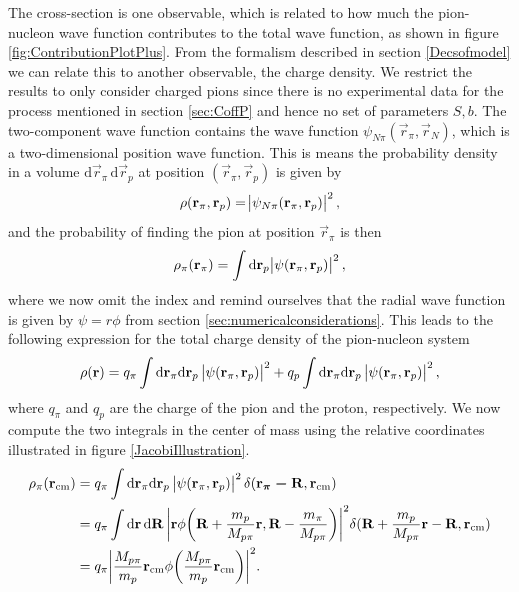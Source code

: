 The cross-section is one observable, which is related to how much the pion-nucleon wave function contributes to the total wave function, as shown in figure  \ref{fig:ContributionPlotPlus}. From the formalism described in section \ref{Decsofmodel} we can relate this to another observable, the charge density. We restrict the results to only consider charged pions since there is no experimental data for the process mentioned in section \ref{sec:CoffP} and hence no set of parameters $S,b$. The two-component wave function contains the wave function $\psi_{N\pi}(\vec{r}_\pi,\vec{r}_N)$, which is a two-dimensional position wave function. This is means the probability density in a volume $\text{d}\vec{r}_\pi \, \text{d}\vec{r}_p$ at position $(\vec{r}_\pi,\vec{r}_p)$ is given by
\begin{equation}\label{probdens}
	\rho(\bm{\mathrm{r}}_\pi,\bm{\mathrm{r}}_p) = \abs{\psi_{N\pi}(\bm{\mathrm{r}}_\pi,\bm{\mathrm{r}}_p)}^2,
\end{equation}
and the probability of finding the pion at position $\vec{r}_\pi$ is then
\begin{equation}\label{posirpi}
	\rho_\pi(\bm{\mathrm{r}}_\pi) = \int \text{d}\bm{\mathrm{r}}_p \abs{\psi(\bm{\mathrm{r}}_\pi,\bm{\mathrm{r}}_p)}^2,
\end{equation}
where we now omit the index and remind ourselves that the radial wave function is given by $\psi=r\phi$ from section \ref{sec:numericalconsiderations}. This leads to the following expression for the total charge density of the pion-nucleon system
\begin{equation}\label{pionnuccharge}
	\rho(\bm{\mathrm{r}}) = q_\pi \int \text{d}\bm{\mathrm{r}}_\pi \text{d}\bm{\mathrm{r}}_p \, \abs{\psi(\bm{\mathrm{r}}_\pi,\bm{\mathrm{r}}_p)}^2+q_p \int \text{d}\bm{\mathrm{r}}_\pi \text{d}\bm{\mathrm{r}}_p \, \abs{\psi(\bm{\mathrm{r}}_\pi,\bm{\mathrm{r}}_p)}^2,
\end{equation}
where $q_\pi$ and $q_p$ are the charge of the pion and the proton, respectively. We now compute the two integrals in the center of mass using the relative coordinates illustrated in figure \ref{JacobiIllustration}.
\begin{align}
	\rho_\pi(\bm{\mathrm{r}}_\text{cm}) &= q_\pi \int \text{d}\bm{\mathrm{r}}_\pi \text{d} \bm{\mathrm{r}}_p \, \abs{\psi(\bm{\mathrm{r}}_\pi,\bm{\mathrm{r}}_p)}^2 \delta(\bm{\mathrm{r_\pi-\bm{\mathrm{R}}}},\bm{\mathrm{r}}_\text{cm}) \\
	&= q_\pi \int \text{d}\bm{\mathrm{r}} \,\text{d}\bm{\mathrm{R}} \, \bigg\lvert\bm{\mathrm{r}}\phi\bigg(\bm{\mathrm{R}}+\frac{m_p}{M_{p\pi}}\bm{\mathrm{r}},\bm{\mathrm{R}}-\frac{m_\pi}{M_{p\pi}}\bigg)\bigg\rvert^2 \delta(\bm{\mathrm{R}}+\frac{m_p}{M_{p\pi}}\bm{\mathrm{r}}-\bm{\mathrm{R}},\bm{\mathrm{r}}_\text{cm}) \\
	&= q_\pi \bigg \lvert\frac{M_{p\pi}}{m_p}\bm{\mathrm{r}}_\text{cm}\phi\bigg(\frac{M_{p\pi}}{m_p}\bm{\mathrm{r}}_{\text{cm}}\bigg) \bigg\rvert^2.
\end{align}
